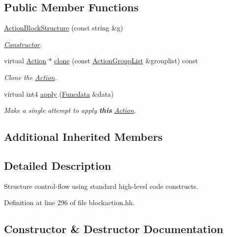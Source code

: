 \subsection*{Public Member Functions}
\begin{DoxyCompactItemize}
\item 
\mbox{\hyperlink{class_action_block_structure_ab7a8efa0c54dc3ca5b42d7dc4ca23121}{Action\+Block\+Structure}} (const string \&g)
\begin{DoxyCompactList}\small\item\em \mbox{\hyperlink{class_constructor}{Constructor}}. \end{DoxyCompactList}\item 
virtual \mbox{\hyperlink{class_action}{Action}} $\ast$ \mbox{\hyperlink{class_action_block_structure_ab86eb695c4acc6d3e69cbbc844445fdc}{clone}} (const \mbox{\hyperlink{class_action_group_list}{Action\+Group\+List}} \&grouplist) const
\begin{DoxyCompactList}\small\item\em Clone the \mbox{\hyperlink{class_action}{Action}}. \end{DoxyCompactList}\item 
virtual int4 \mbox{\hyperlink{class_action_block_structure_a59e5e7c8f0d703b778d06e2e6373cd27}{apply}} (\mbox{\hyperlink{class_funcdata}{Funcdata}} \&data)
\begin{DoxyCompactList}\small\item\em Make a single attempt to apply {\bfseries{this}} \mbox{\hyperlink{class_action}{Action}}. \end{DoxyCompactList}\end{DoxyCompactItemize}
\subsection*{Additional Inherited Members}


\subsection{Detailed Description}
Structure control-\/flow using standard high-\/level code constructs. 

Definition at line 296 of file blockaction.\+hh.



\subsection{Constructor \& Destructor Documentation}
\mbox{\label{class_action_block_structure_ab7a8efa0c54dc3ca5b42d7dc4ca23121}} 
